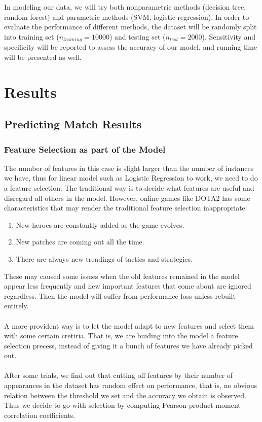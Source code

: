 \documentclass[11pt]{article}
\begin{document}
\noindent In modeling our data, we will try both nonparametric methods (decision tree, random forest) and parametric methods (SVM, logistic regression). In order to evaluate the performance of different methods, the dataset will be randomly split into training set ($n_{training} = 10000$) and testing set ($n_{test} = 2000$). Sensitivity and specificity will be reported to assess the accuracy of our model, and running time will be presented as well. 

\section{Results}
\subsection{Predicting Match Results}
\subsubsection{Feature Selection as part of the Model}
The number of features in this case is slight larger than the number of instances we have, thus for linear model such as Logistic Regression to work, we need to do a feature selection. The traditional way is to decide what features are useful and disregard all others in the model. However, online games like DOTA2 has some characteristics that may render the traditional feature selection inappropriate:
\begin{enumerate}
\item New heroes are constantly added as the game evolves.
\item New patches are coming out all the time.
\item There are always new trendings of tactics and strategies.
\end{enumerate}

\noindent These may caused some issues when the old features remained in the model appear less frequently and new important features that come about are ignored regardless. Then the model will suffer from performance loss unless rebuilt entirely.\\
\\
A more provident way is to let the model adapt to new features and select them with some certain cretiria. That is, we are buiding into the model a feature selection precess, instead of giving it a bunch of features we have already picked out.\\
\\
After some trials, we find out that cutting off features by their number of appearances in the dataset has random effect on performance, that is, no obvious relation between the threshold we set and the accuracy we obtain is observed. Thus we decide to go with selection by computing Pearson product-moment correlation coefficients.
\end{document}
